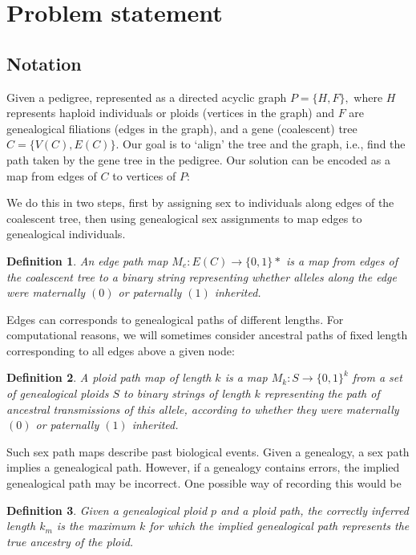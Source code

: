 \documentclass[14pt]{extarticle}
\newtheorem{definition}{Definition}
\begin{document}
\section{Problem statement}

\subsection{Notation}

Given a pedigree, represented as a directed acyclic graph $P = \{H, F\},$ where $H$ represents haploid individuals or ploids (vertices in the graph) and $F$ are genealogical filiations (edges in the graph), and a gene (coalescent) tree $C = \{V(C), E(C)\}.$ Our goal is to `align' the tree and the graph, i.e., find the path taken by the gene tree in the pedigree. Our solution can be encoded as a map from edges of $C$ to vertices of $P$:

We do this in two steps, first by assigning sex to individuals along edges of the coalescent tree, then using genealogical sex assignments to map edges to genealogical individuals.  

\begin{definition}
An edge path map $M_e:E(C) \rightarrow \{0,1\}*$ is a map from edges of the coalescent tree to a binary string representing whether alleles along the edge were maternally $(0)$ or paternally $(1)$ inherited.     
\end{definition}

Edges can corresponds to genealogical paths of different lengths. For computational reasons, we will sometimes consider ancestral paths of fixed length corresponding to all edges above a given node:

\begin{definition}
A ploid path map of length $k$ is a map $M_k:S \rightarrow \{0,1\}^k$ from a set of genealogical ploids $S$ to binary strings of length $k$ representing the path of ancestral transmissions of this allele, according to whether they were maternally $(0)$ or paternally $(1)$ inherited.      
\end{definition}

Such sex path maps describe past biological events. Given a genealogy, a sex path implies a genealogical path. However, if a genealogy contains errors, the implied genealogical path may be incorrect. One possible way of recording this would be

\begin{definition}
Given a genealogical ploid $p$ and a ploid path, the correctly inferred length $k_m$ is the maximum $k$ for which the implied genealogical path represents the true ancestry of the ploid.        
\end{definition}
\end{document}
